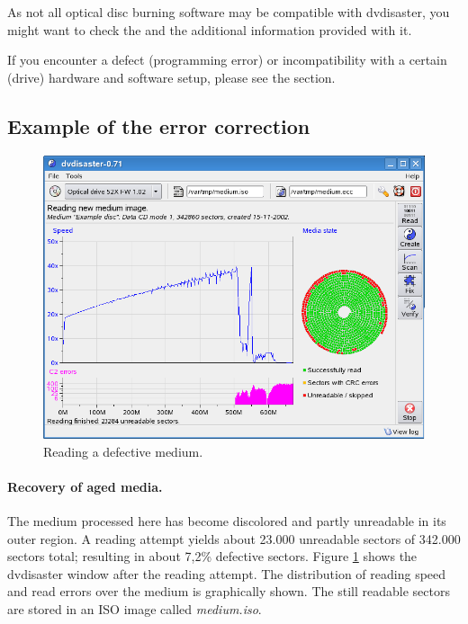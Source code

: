 \smallskip

As not all optical disc burning software may be compatible with dvdisaster,
you might want to check
the  and the additional
information provided with it.

\smallskip

If you encounter a defect (programming error) or
incompatibility with a certain (drive) hardware and software setup,
please see the  section.


\subsection{Example of the error correction}

\begin{figure}[h]
\centerline{\includegraphics[width=\textwidth]{screenshots/recover-linear.png}}
\caption{Reading a defective medium.}  
\label{recover-linear}
\end{figure}

\paragraph{Recovery of aged media.} 
The medium processed here has become discolored and partly unreadable in its outer region.
A reading attempt yields about 23.000 unreadable sectors of 342.000 sectors total;
resulting in about 7,2\% defective sectors. Figure \ref{recover-linear} shows the
dvdisaster window after the reading attempt. The distribution of reading speed and
read errors over the medium is graphically shown.
The still readable sectors are stored in an ISO image called {\em medium.iso}.

